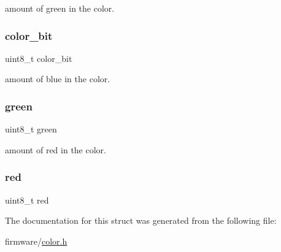 amount of green in the color. \hypertarget{structled__color__t_a20303e3baf7a44885164f4a273c8b23d}{}\label{structled__color__t_a20303e3baf7a44885164f4a273c8b23d} 
\subsubsection{\texorpdfstring{color\+\_\+bit}{color\_bit}}
{\footnotesize\ttfamily uint8\+\_\+t color\+\_\+bit}

amount of blue in the color. \hypertarget{structled__color__t_a90d21fa503b626c00cdc8d94863d5877}{}\label{structled__color__t_a90d21fa503b626c00cdc8d94863d5877} 
\subsubsection{\texorpdfstring{green}{green}}
{\footnotesize\ttfamily uint8\+\_\+t green}

amount of red in the color. \hypertarget{structled__color__t_ad47d918910aaa51c73160ac85999d09c}{}\label{structled__color__t_ad47d918910aaa51c73160ac85999d09c} 
\subsubsection{\texorpdfstring{red}{red}}
{\footnotesize\ttfamily uint8\+\_\+t red}



The documentation for this struct was generated from the following file\+:\begin{DoxyCompactItemize}
\item 
firmware/\hyperlink{color_8h}{color.\+h}\end{DoxyCompactItemize}
